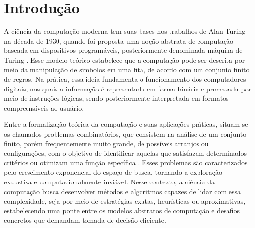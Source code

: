 %

\chapter*[Introdução]{Introdução}

A ciência da computação moderna tem suas bases nos trabalhos de Alan Turing na década de 1930, quando foi proposta uma noção abstrata de computação baseada em dispositivos programáveis, posteriormente denominada máquina de Turing \cite{sipser1996introduction, farias2013introduccao}. Esse modelo teórico estabelece que a computação pode ser descrita por meio da manipulação de símbolos em uma fita, de acordo com um conjunto finito de regras. Na prática, essa ideia fundamenta o funcionamento dos computadores digitais, nos quais a informação é representada em forma binária e processada por meio de instruções lógicas, sendo posteriormente interpretada em formatos compreensíveis ao usuário. \cite{hopcroftintroduction}

Entre a formalização teórica da computação e suas aplicações práticas, situam-se os chamados problemas combinatórios, que consistem na análise de um conjunto finito, porém frequentemente muito grande, de possíveis arranjos ou configurações, com o objetivo de identificar aquelas que satisfazem determinados critérios ou otimizam uma função específica \cite{papadimitriou1998combinatorial}. Esses problemas são caracterizados pelo crescimento exponencial do espaço de busca, tornando a exploração exaustiva e computacionalmente inviável. Nesse contexto, a ciência da computação busca desenvolver métodos e algoritmos capazes de lidar com essa complexidade, seja por meio de estratégias exatas, heurísticas ou aproximativas, estabelecendo uma ponte entre os modelos abstratos de computação e desafios concretos que demandam tomada de decisão eficiente.

